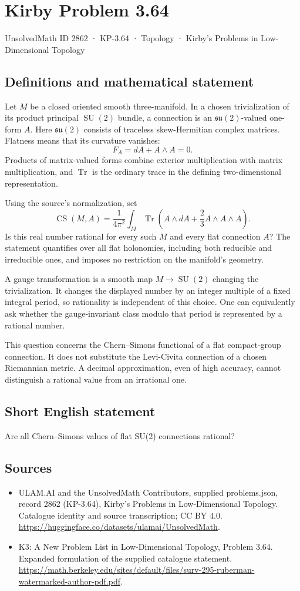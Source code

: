 \documentclass[11pt,a4paper]{article}
\begin{document}
\section*{Kirby Problem 3.64}\label{2862}
{\small UnsolvedMath ID 2862 · KP-3.64 · Topology · Kirby's Problems in Low-Dimensional Topology}
\subsection{Definitions and mathematical statement}
Let $M$ be a closed oriented smooth three-manifold. In a chosen trivialization of its product principal $\operatorname{SU}(2)$ bundle, a connection is an $\mathfrak{su}(2)$-valued one-form $A$. Here $\mathfrak{su}(2)$ consists of traceless skew-Hermitian complex matrices. Flatness means that its curvature vanishes:
\[
F_A=dA+A\wedge A=0.
\]
Products of matrix-valued forms combine exterior multiplication with matrix multiplication, and $\operatorname{Tr}$ is the ordinary trace in the defining two-dimensional representation.

Using the source's normalization, set
\[
\operatorname{CS}(M,A)=\frac1{4\pi^2}
\int_M\operatorname{Tr}\left(A\wedge dA+\frac23A\wedge A\wedge A\right).
\]
Is this real number rational for every such $M$ and every flat connection $A$? The statement quantifies over all flat holonomies, including both reducible and irreducible ones, and imposes no restriction on the manifold's geometry.

A gauge transformation is a smooth map $M\to\operatorname{SU}(2)$ changing the trivialization. It changes the displayed number by an integer multiple of a fixed integral period, so rationality is independent of this choice. One can equivalently ask whether the gauge-invariant class modulo that period is represented by a rational number.

This question concerns the Chern--Simons functional of a flat compact-group connection. It does not substitute the Levi-Civita connection of a chosen Riemannian metric. A decimal approximation, even of high accuracy, cannot distinguish a rational value from an irrational one.
\subsection{Short English statement}
Are all Chern--Simons values of flat SU(2) connections rational?
\subsection{Sources}
\begin{itemize}
\item[S1] ULAM.AI and the UnsolvedMath Contributors, supplied problems.json, record 2862 (KP-3.64), Kirby's Problems in Low-Dimensional Topology. Catalogue identity and source transcription; CC BY 4.0.
\url{https://huggingface.co/datasets/ulamai/UnsolvedMath}.
\item[S2] K3: A New Problem List in Low-Dimensional Topology, Problem 3.64. Expanded formulation of the supplied catalogue statement.
\url{https://math.berkeley.edu/sites/default/files/surv-295-ruberman-watermarked-author-pdf.pdf}.
\end{itemize}
\end{document}
